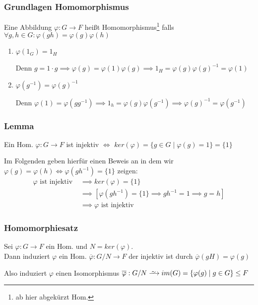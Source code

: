 \documentclass[12pt, german]{article}
\newcommand\iso{\xrightarrow{
		\,\smash{\raisebox{-0.65ex}{\ensuremath{\scriptstyle\sim}}}\,}}
\begin{document}
\subsubsection{Grundlagen Homomorphismus}
	Eine Abbildung $\varphi: G \to F$ heißt Homomorphismus\footnote{ab hier abgekürzt Hom.} falls $\forall g,h \in G : \varphi(gh) = \varphi(g)\varphi(h)$ \\
	\begin{enumerate}[label=\roman*)]
		\item $\varphi(1_G) = 1_H$ ~\par
			Denn $g=1\cdot g \implies \varphi(g)=\varphi(1)\varphi(g) \implies 1_H = \varphi(g) \varphi(g)^{-1} = \varphi(1)$
		
		\item $\varphi(g^{-1})=\varphi(g)^{-1}$ ~\par
			Denn $\varphi(1)=\varphi(gg^{-1}) \implies 1_h = \varphi(g)\varphi(g^{-1}) \implies \varphi(g)^{-1} = \varphi(g^{-1})$
	\end{enumerate}

\subsubsection{Lemma}
	Ein Hom. $\varphi: G \to F$ ist injektiv $\iff$ $ker(\varphi) = \{g \in G \mid \varphi(g)= 1\} = \{1\}$ 
	
	Im Folgenden geben hierfür einen Beweis an in dem wir $\varphi(g) = \varphi(h) \iff \varphi(gh^{-1}) = \{1\} $ zeigen:
	\begin{align*}
		\varphi \text{ ist injektiv } &\implies ker(\varphi) = \{1\} \\
		&\implies [\varphi(gh^{-1}) = \{1\} \implies gh^{-1} = 1 \implies g = h] \\ 
		&\implies \varphi \text{ ist injektiv}
	\end{align*}

\subsubsection{Homomorphiesatz}
	Sei $\varphi: G \to F$ ein Hom.  und $N = ker(\varphi)$. \\
	Dann induziert $\varphi$ ein Hom. $\overline{\varphi} : G/N \to F$ der injektiv ist durch $\overline{\varphi}(gH) = \varphi(g)$ 
	\newline
	
	Also induziert $\varphi$ einen Isomorphismus $\overline{\varphi}: G/N \iso im(G) = \{\varphi(g) \mid g \in G\} \leq F$
\end{document}
